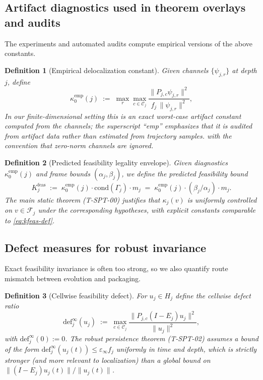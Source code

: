 \documentclass[11pt]{article}
\newtheorem{definition}{Definition}[section]
\begin{document}
\subsection{Artifact diagnostics used in theorem overlays and audits}

The experiments and automated audits compute empirical versions of the above constants.

\begin{definition}[Empirical delocalization constant]\label{def:kappa0-emp}
Given channels $\{\psi_{j,r}\}$ at depth $j$, define
\begin{equation}\label{eq:kappa0-emp}
\kappa_0^{\mathrm{emp}}(j)
\;:=\;
\max_{r}\max_{c\in\mathcal{C}_j}
\frac{\|P_{j,c}\psi_{j,r}\|^2}{f_j\,\|\psi_{j,r}\|^2},
\end{equation}
In our finite-dimensional setting this is an exact worst-case artifact constant computed from the channels; the superscript ``emp'' emphasizes that it is audited from artifact data rather than estimated from trajectory samples.
with the convention that zero-norm channels are ignored.
\end{definition}

\begin{definition}[Predicted feasibility legality envelope]\label{def:kfeas}
Given diagnostics $\kappa_0^{\mathrm{emp}}(j)$ and frame bounds $(\alpha_j,\beta_j)$, we define the predicted feasibility bound
\begin{equation}\label{eq:kfeas-def}
K^{\mathrm{feas}}_j
\;:=\;
\kappa_0^{\mathrm{emp}}(j)\cdot \mathrm{cond}(\Gamma_j)\cdot m_j
\;=\;
\kappa_0^{\mathrm{emp}}(j)\cdot (\beta_j/\alpha_j)\cdot m_j.
\end{equation}
The main static theorem (T-SPT-00) justifies that $\kappa_j(v)$ is uniformly controlled on $v\in\mathcal{F}_j$ under the corresponding hypotheses, with explicit constants comparable to \eqref{eq:kfeas-def}.
\end{definition}

\subsection{Defect measures for robust invariance}

Exact feasibility invariance is often too strong, so we also quantify route mismatch between evolution and packaging.

\begin{definition}[Cellwise feasibility defect]\label{def:defect-infty}
For $u_j\in H_j$ define the cellwise defect ratio
\begin{equation}\label{eq:defect-infty}
\mathrm{def}^{\infty}_j(u_j)
\;:=\;
\max_{c\in\mathcal{C}_j}
\frac{\|P_{j,c}(I-E_j)u_j\|^2}{\|u_j\|^2},
\end{equation}
with $\mathrm{def}^{\infty}_j(0):=0$.
The robust persistence theorem (T-SPT-02) assumes a bound of the form
$\mathrm{def}^{\infty}_j(u_j(t)) \le \varepsilon_\infty f_j$ uniformly in time and depth, which is strictly stronger (and more relevant to localization) than a global bound on $\|(I-E_j)u_j(t)\|/\|u_j(t)\|$.
\end{definition}
\end{document}

